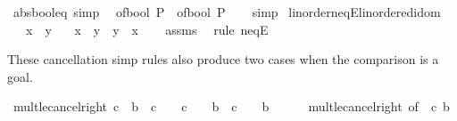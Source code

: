 \begin{isabellebody}
\endisatagproof
{\isafoldproof}%
%
\isadelimproof
\isanewline
%
\endisadelimproof
\isanewline
{}\isamarkupfalse%
\ abs{\isacharunderscore}{\kern0pt}bool{\isacharunderscore}{\kern0pt}eq\ {\isacharbrackleft}{\kern0pt}simp{\isacharbrackright}{\kern0pt}{\isacharcolon}{\kern0pt}\isanewline
\ \ {\isacartoucheopen}{\isasymbar}of{\isacharunderscore}{\kern0pt}bool\ P{\isasymbar}\ {\isacharequal}{\kern0pt}\ of{\isacharunderscore}{\kern0pt}bool\ P{\isacartoucheclose}\isanewline
%
\isadelimproof
\ \ %
\endisadelimproof
%
\isatagproof
{}\isamarkupfalse%
\ simp%
\endisatagproof
{\isafoldproof}%
%
\isadelimproof
\isanewline
%
\endisadelimproof
\isanewline
{}\isamarkupfalse%
\ linorder{\isacharunderscore}{\kern0pt}neqE{\isacharunderscore}{\kern0pt}linordered{\isacharunderscore}{\kern0pt}idom{\isacharcolon}{\kern0pt}\isanewline
\ \ \ {\isachardoublequoteopen}x\ {\isasymnoteq}\ y{\isachardoublequoteclose}\isanewline
\ \ \ {\isachardoublequoteopen}x\ {\isacharless}{\kern0pt}\ y{\isachardoublequoteclose}\ {\isacharbar}{\kern0pt}\ {\isachardoublequoteopen}y\ {\isacharless}{\kern0pt}\ x{\isachardoublequoteclose}\isanewline
%
\isadelimproof
\ \ %
\endisadelimproof
%
\isatagproof
{}\isamarkupfalse%
\ assms\ \isamarkupfalse%
\ {\isacharparenleft}{\kern0pt}rule\ neqE{\isacharparenright}{\kern0pt}%
\endisatagproof
{\isafoldproof}%
%
\isadelimproof
%
\endisadelimproof
%
\begin{isamarkuptext}%
These cancellation simp rules also produce two cases when the comparison is a goal.%
\end{isamarkuptext}\isamarkuptrue%
\isamarkupfalse%
\ mult{\isacharunderscore}{\kern0pt}le{\isacharunderscore}{\kern0pt}cancel{\isacharunderscore}{\kern0pt}right{}{\isacharcolon}{\kern0pt}\ {\isachardoublequoteopen}c\ {\isasymle}\ b\ {\isacharasterisk}{\kern0pt}\ c\ {\isasymlongleftrightarrow}\ {\isacharparenleft}{\kern0pt}{}\ {\isacharless}{\kern0pt}\ c\ {\isasymlongrightarrow}\ {}\ {\isasymle}\ b{\isacharparenright}{\kern0pt}\ {\isasymand}\ {\isacharparenleft}{\kern0pt}c\ {\isacharless}{\kern0pt}\ {}\ {\isasymlongrightarrow}\ b\ {\isasymle}\ {}{\isacharparenright}{\kern0pt}{\isachardoublequoteclose}\isanewline
%
\isadelimproof
\ \ %
\endisadelimproof
%
\isatagproof
{}\isamarkupfalse%
\ mult{\isacharunderscore}{\kern0pt}le{\isacharunderscore}{\kern0pt}cancel{\isacharunderscore}{\kern0pt}right\ {\isacharbrackleft}{\kern0pt}of\ {}\ c\ b{\isacharbrackright}{\kern0pt}\ \isamarkupfalse%

\end{isabellebody}
